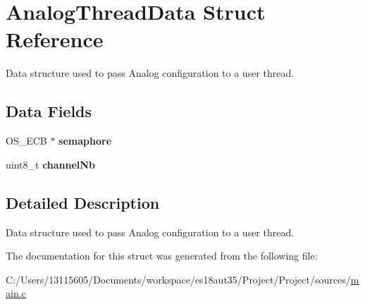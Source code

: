 \hypertarget{struct_analog_thread_data}{}\section{Analog\+Thread\+Data Struct Reference}
\label{struct_analog_thread_data}


Data structure used to pass Analog configuration to a user thread.  


\subsection*{Data Fields}
\begin{DoxyCompactItemize}
\item 
\hypertarget{struct_analog_thread_data_a02d829e2506377585485044548fc85e2}{}O\+S\+\_\+\+E\+C\+B $\ast$ {\bfseries semaphore}\label{struct_analog_thread_data_a02d829e2506377585485044548fc85e2}

\item 
\hypertarget{struct_analog_thread_data_a896bcccdd678ec542be06dcb6cc91031}{}uint8\+\_\+t {\bfseries channel\+Nb}\label{struct_analog_thread_data_a896bcccdd678ec542be06dcb6cc91031}

\end{DoxyCompactItemize}


\subsection{Detailed Description}
Data structure used to pass Analog configuration to a user thread. 



The documentation for this struct was generated from the following file\+:\begin{DoxyCompactItemize}
\item 
C\+:/\+Users/13115605/\+Documents/workspace/es18aut35/\+Project/\+Project/sources/\hyperlink{main_8c}{main.\+c}\end{DoxyCompactItemize}
